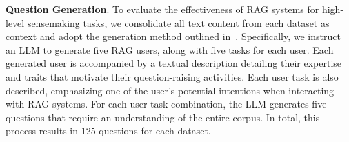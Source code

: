 \documentclass{article} %
\begin{document}
\textbf{Question Generation}. 
To evaluate the effectiveness of RAG systems for high-level sensemaking tasks, we consolidate all text content from each dataset as context and adopt the generation method outlined in~\cite{edge2024local}. Specifically, we instruct an LLM to generate five RAG users, along with five tasks for each user. Each generated user is accompanied by a textual description detailing their expertise and traits that motivate their question-raising activities. Each user task is also described, emphasizing one of the user's potential intentions when interacting with RAG systems. For each user-task combination, the LLM generates five questions that require an understanding of the entire corpus. In total, this process results in 125 questions for each dataset.
\end{document}
